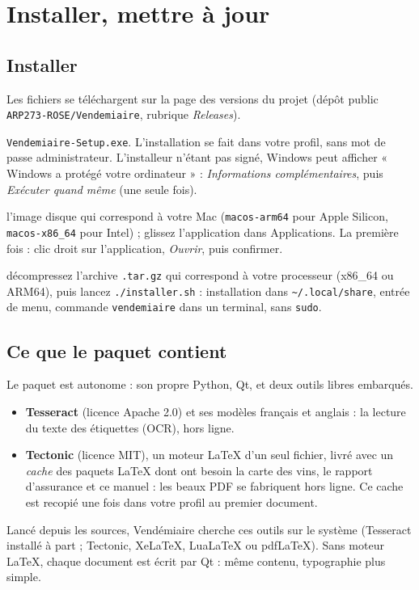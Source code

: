 \documentclass[11pt,a4paper]{article}
\begin{document}
\section{Installer, mettre à jour}

\subsection{Installer}
Les fichiers se téléchargent sur la page des versions du projet (dépôt public
\texttt{ARP273-ROSE/\allowbreak Vendemiaire}, rubrique \emph{Releases}).
\begin{description}[style=nextline,leftmargin=1.2em]
  \item[Windows] \texttt{Vendemiaire-Setup.exe}. L'installation se fait dans votre profil, sans mot de
    passe administrateur. L'installeur n'étant pas signé, Windows peut afficher « Windows a protégé votre
    ordinateur » : \emph{Informations complémentaires}, puis \emph{Exécuter quand même} (une seule fois).
  \item[macOS] l'image disque qui correspond à votre Mac (\texttt{macos-arm64} pour Apple Silicon,
    \texttt{macos-x86\_64} pour Intel) ; glissez l'application dans Applications. La première fois :
    clic droit sur l'application, \emph{Ouvrir}, puis confirmer.
  \item[Linux] décompressez l'archive \texttt{.tar.gz} qui correspond à votre processeur (x86\_64 ou
    ARM64), puis lancez \texttt{./installer.sh} : installation dans \texttt{\textasciitilde/.local/share}, entrée de menu,
    commande \texttt{vendemiaire} dans un terminal, sans \texttt{sudo}.
\end{description}

\subsection{Ce que le paquet contient}
Le paquet est autonome : son propre Python, Qt, et deux outils libres embarqués.
\begin{itemize}
  \item \textbf{Tesseract} (licence Apache 2.0) et ses modèles français et anglais : la lecture du texte
        des étiquettes (OCR), hors ligne.
  \item \textbf{Tectonic} (licence MIT), un moteur LaTeX d'un seul fichier, livré avec un \emph{cache} des
        paquets LaTeX dont ont besoin la carte des vins, le rapport d'assurance et ce manuel : les beaux PDF
        se fabriquent hors ligne. Ce cache est recopié une fois dans votre profil au premier document.
\end{itemize}
Lancé depuis les sources, Vendémiaire cherche ces outils sur le système (Tesseract installé à part ;
Tectonic, XeLaTeX, LuaLaTeX ou pdfLaTeX). Sans moteur LaTeX, chaque document est écrit par Qt : même
contenu, typographie plus simple.
\end{document}
